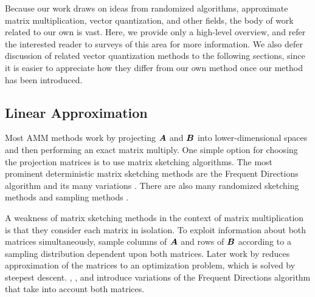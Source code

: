 
Because our work draws on ideas from randomized algorithms, approximate matrix multiplication, vector quantization, and other fields, the body of work related to our own is vast.
Here, we provide only a high-level overview, and refer the interested reader to
surveys of this area \cite{learningToHashSurvey, hashingSimilaritySurvey, isvd} for more information.
We also defer discussion of related vector quantization methods to the following sections, since it is easier to appreciate how they differ from our own method once our method has been introduced.

\vspace{-1mm}
\subsection{Linear Approximation}
Most AMM methods work by projecting $\bm{A}$ and $\bm{B}$ into lower-dimensional spaces and then performing an exact matrix multiply.
One simple option for choosing the projection matrices is to use matrix sketching algorithms. The most prominent deterministic matrix sketching methods are the Frequent Directions algorithm \cite{liberty_simple_2012, ghashami_frequent_2016} and its many variations \cite{teng_fast_2019, francis_practical_2018, ye_frequent_2016, huang_near_2019, luo_robust_2019, francis_improvement_2018}. There are also many randomized sketching methods \cite{sarlos_improved_2006, kyrillidis_approximate_2014, pagh_compressed_2013, hashjl,osnap} and sampling methods \cite{drineas_fast_2006-1, drineas_fast_2006-2}.

A weakness of matrix sketching methods in the context of matrix multiplication is that they consider each matrix in isolation. To exploit information about both matrices simultaneously, \citet{drineas_fast_2006} sample columns of $\bm{A}$ and rows of $\bm{B}$ according to a sampling distribution dependent upon both matrices. Later work by \citet{manne_fast_2014} reduces approximation of the matrices to an optimization problem, which is solved by steepest descent. \citet{mroueh_co-occuring_2016}, \citet{ye_frequent_2016}, and \citet{francis_improvement_2018} introduce variations of the Frequent Directions algorithm that take into account both matrices.

